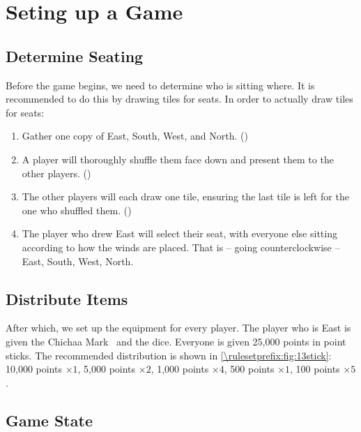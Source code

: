 \section{Seting up a Game}\label{core:sec:hanchan}

\subsection{Determine Seating}\label{core:ssec:seating}

Before the game begins, we need to determine who is sitting where. It is recommended to do this by drawing tiles for seats. In order to actually draw tiles for seats:
\begin{enumerate}
	\item Gather one copy of East, South, West, and North. ({})
	\item A player will thoroughly shuffle them face down and present them to the other players. ({})
	\item The other players will each draw one tile, ensuring the last tile is left for the one who shuffled them. ({})
	\item The player who drew East will select their seat, with everyone else sitting according to how the winds are placed. That is -- going counterclockwise -- East, South, West, North.
\end{enumerate}

\subsection{Distribute Items}\label{core:ssec:distribute-items}

After which, we set up the equipment for every player. The player who is East is given the Chichaa Mark~ and the dice. Everyone is given 25,000 points in point sticks. The recommended distribution is shown in \autoref{\rulesetprefix:fig:13stick}: 10,000 points \(\times 1\), 5,000 points \(\times 2\), 1,000 points \(\times 4\), 500 points \(\times 1\), 100 points \(\times 5\).

\subsection{Game State}\label{core:ssec:game-state}
